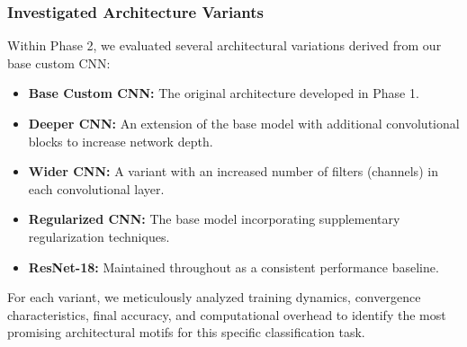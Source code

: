 \subsubsection{Investigated Architecture Variants}
Within Phase 2, we evaluated several architectural variations derived from our base custom CNN:
\begin{itemize}
    \item \textbf{Base Custom CNN:} The original architecture developed in Phase 1.
    \item \textbf{Deeper CNN:} An extension of the base model with additional convolutional blocks to increase network depth.
    \item \textbf{Wider CNN:} A variant with an increased number of filters (channels) in each convolutional layer.
    \item \textbf{Regularized CNN:} The base model incorporating supplementary regularization techniques.
    \item \textbf{ResNet-18:} Maintained throughout as a consistent performance baseline.
\end{itemize}
For each variant, we meticulously analyzed training dynamics, convergence characteristics, final accuracy, and computational overhead to identify the most promising architectural motifs for this specific classification task.



